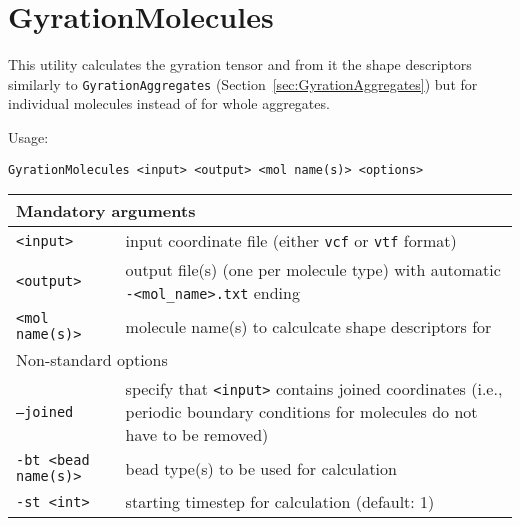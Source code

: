 \section{GyrationMolecules} \label{sec:GyrationMolecules}

This utility calculates the gyration tensor and from it the shape
descriptors similarly to \texttt{GyrationAggregates}
(Section~\ref{sec:GyrationAggregates}) but for individual molecules
instead of for whole aggregates.

Usage:

\vspace{1em}
\noindent
\texttt{GyrationMolecules <input> <output> <mol name(s)> <options>}

\noindent
\begin{longtable}{p{}p{}}
  \toprule
  \multicolumn{2}{l}{Mandatory arguments} \\
  \midrule
  \texttt{<input>} & input coordinate file (either \texttt{vcf} or
    \texttt{vtf} format) \\
  \texttt{<output>} & output file(s) (one per molecule type) with
    automatic \texttt{-<mol\_name>.txt} ending \\
  \texttt{<mol name(s)>} & molecule name(s) to calculcate shape descriptors for \\
  \toprule
  \multicolumn{2}{l}{Non-standard options} \\
  \midrule
  \texttt{--joined} & specify that \texttt{<input>} contains joined
    coordinates (i.e., periodic boundary conditions for molecules do not
    have to be removed) \\
  \texttt{-bt <bead name(s)>} & bead type(s) to be used for calculation \\
  \texttt{-st <int>} & starting timestep for calculation (default: 1) \\
  \bottomrule
\end{longtable}

